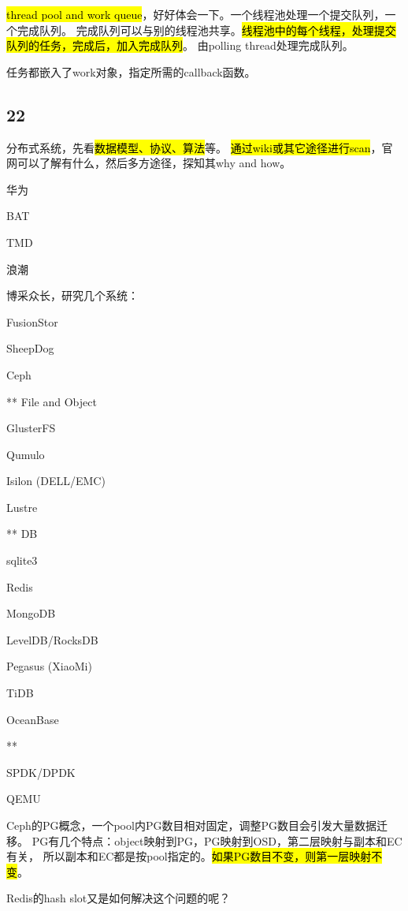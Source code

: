 \hl{thread pool and work queue}，好好体会一下。一个线程池处理一个提交队列，一个完成队列。
完成队列可以与别的线程池共享。\hl{线程池中的每个线程，处理提交队列的任务，完成后，加入完成队列}。
由polling thread处理完成队列。

任务都嵌入了work对象，指定所需的callback函数。

\subsection{22}

分布式系统，先看\hl{数据模型、协议、算法}等。
\hl{通过wiki或其它途径进行scan}，官网可以了解有什么，然后多方途径，探知其why and how。

\begin{enumbox}
\item 华为
\item BAT
\item TMD
\item 浪潮
\end{enumbox}

博采众长，研究几个系统：
\begin{enumbox}
\item FusionStor
\item SheepDog
\item Ceph
\item *** File and Object
\item GlusterFS
\item Qumulo
\item Isilon (DELL/EMC)
\item Lustre
\item *** DB
\item sqlite3
\item Redis
\item MongoDB
\item LevelDB/RocksDB
\item Pegasus (XiaoMi)
\item TiDB
\item OceanBase
\item ***
\item SPDK/DPDK
\item QEMU
\end{enumbox}

Ceph的PG概念，一个pool内PG数目相对固定，调整PG数目会引发大量数据迁移。
PG有几个特点：object映射到PG，PG映射到OSD，第二层映射与副本和EC有关，
所以副本和EC都是按pool指定的。\hl{如果PG数目不变，则第一层映射不变}。

Redis的hash slot又是如何解决这个问题的呢？

